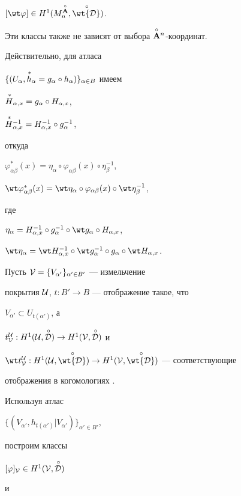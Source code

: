 $[\wt\varphi] \in H^1 (M^{\Ao}_n,\puto{\wt {\cal D}})$.


Эти классы также не зависят от выбора $\overset{\circ}{\bold A}{}^n$-координат.


Действительно, для атласа


$\{(U_\alpha,{\puts h}_\alpha=g_\alpha\circ


h_\alpha)\}_{\alpha\in B}$  имеем


${\overset{\,\ast}{H}{}}_{\alpha,x}=g_\alpha\circ H_{\alpha,x}$,


${\overset{\,\ast}{H}{}}{}_{\alpha,x}^{-1}=H_{\alpha,x}^{-1}\circ g^{-1}_\alpha$,


откуда


$\varphi^*_{\alpha \beta}(x)=\eta_\alpha\circ


\varphi_{\alpha \beta}(x)\circ\eta_\beta^{-1}$,


$\wt\varphi^*_{\alpha \beta}(x)=\wt\eta_\alpha\circ


\varphi_{\alpha \beta}(x)\circ\wt\eta_\beta^{-1}$,


где


$\eta_\alpha=H_{\alpha,x}^{-1}\circ g^{-1}_\alpha\circ


\wt g_\alpha\circ H_{\alpha,x}$,


$\wt\eta_\alpha=\wt H_{\alpha,x}^{-1}\circ \wt g^{-1}_\alpha


\circ g_\alpha\circ\wt H_{\alpha,x}$.





Пусть ${\cal V}=\{V_{\alpha'}\}_{\alpha'\in B'}$ --- измельчение


покрытия $\cal U$, $t:B'\to B$ --- отображение такое, что


$V_{\alpha'}\subset U_{t(\alpha')}$, а


$t^{\cal U}_{\cal V}:H^1 ({\cal U},{\puto{\cal D}})\to


H^1 ({\cal V},{\puto{\cal D}})$ и


$\wt t{}^{\cal U}_{\cal V}:H^1 ({\cal U},{\puto{\wt{\cal D}}})\to


H^1 ({\cal V},{\puto{\wt{\cal D}}})$ --- соответствующие


отображения в когомологиях \cite{Hirz}.


Используя атлас


$\{(V_{\alpha'},h_{t(\alpha')}|V_{\alpha'})\}_{\alpha'\in B'}$,


построим классы


$[\varphi]_{\cal V}\in H^1({\cal V},{\overset{\,\circ}{\cal D}{}})$


и


